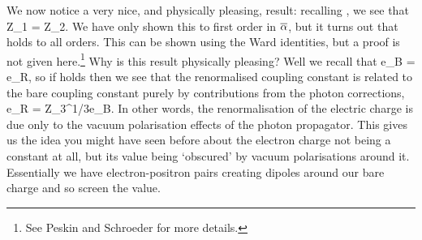 We now notice a very nice, and physically pleasing, result: recalling , we see that
\be 
\label{eqn:Z1=Z2}
    Z_1 = Z_2.
\ee 
We have only shown this to first order in $\overline{\alpha}$, but it turns out that  holds to all orders. This can be shown using the Ward identities, but a proof is not given here.\footnote{See Peskin and Schroeder for more details.} Why is this result physically pleasing? Well we recall that 
\bse 
    e_B =  e_R,
\ese 
so if  holds then we see that the renormalised coupling constant is related to the bare coupling constant purely by contributions from the photon corrections, 
\bse 
    e_R = Z_3^{1/3}e_B.
\ese 
In other words, the renormalisation of the electric charge is due only to the vacuum polarisation effects of the photon propagator. This gives us the idea you might have seen before about the electron charge not being a constant at all, but its value being `obscured' by vacuum polarisations around it. Essentially we have electron-positron pairs creating dipoles around our bare charge and so screen the value. 

